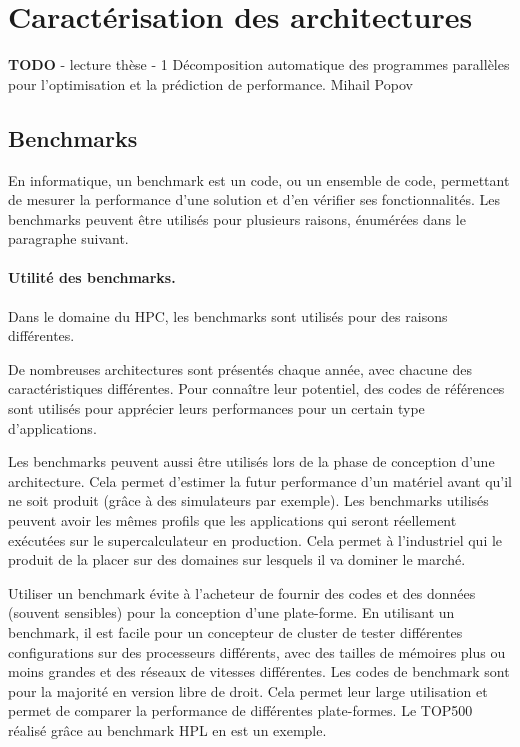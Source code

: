 \section{Caractérisation des architectures}\label{sec:caracterisation}


\textbf{TODO}
- lecture thèse - 1 Décomposition automatique des programmes parallèles pour l’optimisation et la prédiction de performance. Mihail Popov\\




\subsection{Benchmarks}

En informatique, un benchmark est un code, ou un ensemble de code, permettant de mesurer la performance d'une solution et d'en vérifier ses fonctionnalités. Les benchmarks peuvent être utilisés pour plusieurs raisons, énumérées dans le paragraphe suivant. 

\paragraph{Utilité des benchmarks.}
Dans le domaine du HPC, les benchmarks sont utilisés pour des raisons différentes. 
    
    De nombreuses architectures sont présentés chaque année, avec chacune des caractéristiques différentes. Pour connaître leur potentiel, des codes de références sont utilisés pour apprécier leurs performances pour un certain type d'applications. 
    
    Les benchmarks peuvent aussi être utilisés lors de la phase de conception d'une architecture. Cela permet d'estimer la futur performance d'un matériel avant qu'il ne soit produit (grâce à des simulateurs par exemple). Les benchmarks utilisés peuvent avoir les mêmes profils que les applications qui seront réellement exécutées sur le supercalculateur en production. Cela permet à l'industriel qui le produit de la placer sur des domaines sur lesquels il va dominer le marché.
     
    
    Utiliser un benchmark évite à l'acheteur de fournir des codes et des données (souvent sensibles) pour la conception d'une plate-forme. En utilisant un benchmark, il est facile pour un concepteur de cluster de tester différentes configurations sur des processeurs différents, avec des tailles de mémoires plus ou moins grandes et des réseaux de vitesses différentes. 
    Les codes de benchmark sont pour la majorité en version libre de droit. Cela permet leur large utilisation et permet de comparer la performance de différentes plate-formes. Le TOP500 réalisé grâce au benchmark HPL en est un exemple.
     
